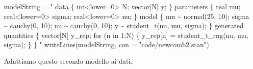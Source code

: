 \documentclass[
  10pt,
  italian,
  a4paper,
  extrafontsizes,onecolumn,openright
  ]{memoir}
\newenvironment{Shaded}{\begin{snugshade}}{\end{snugshade}}
\newcommand{\AttributeTok}[1]{\textcolor[rgb]{0.77,0.63,0.00}{#1}}
\newcommand{\FunctionTok}[1]{\textcolor[rgb]{0.00,0.00,0.00}{#1}}
\newcommand{\NormalTok}[1]{#1}
\newcommand{\OtherTok}[1]{\textcolor[rgb]{0.56,0.35,0.01}{#1}}
\newcommand{\StringTok}[1]{\textcolor[rgb]{0.31,0.60,0.02}{#1}}
\begin{document}
\begin{Shaded}
\begin{Highlighting}[]
\NormalTok{modelString }\OtherTok{=} \StringTok{"}
\StringTok{data \{}
\StringTok{  int\textless{}lower=0\textgreater{} N;}
\StringTok{  vector[N] y;}
\StringTok{\}}
\StringTok{parameters \{}
\StringTok{  real mu;}
\StringTok{  real\textless{}lower=0\textgreater{} sigma;}
\StringTok{  real\textless{}lower=0\textgreater{} nu;}
\StringTok{\}}
\StringTok{model \{}
\StringTok{  mu \textasciitilde{} normal(25, 10);}
\StringTok{  sigma \textasciitilde{} cauchy(0, 10);}
\StringTok{  nu \textasciitilde{} cauchy(0, 10);}
\StringTok{  y \textasciitilde{} student\_t(nu, mu, sigma);}
\StringTok{\}}
\StringTok{generated quantities \{}
\StringTok{  vector[N] y\_rep;}
\StringTok{  for (n in 1:N) \{}
\StringTok{    y\_rep[n] = student\_t\_rng(nu, mu, sigma);}
\StringTok{  \}}
\StringTok{\}}
\StringTok{"}
\FunctionTok{writeLines}\NormalTok{(modelString, }\AttributeTok{con =} \StringTok{"code/newcomb2.stan"}\NormalTok{)}
\end{Highlighting}
\end{Shaded}

\noindent
Adattiamo questo secondo modello ai dati.
\end{document}
